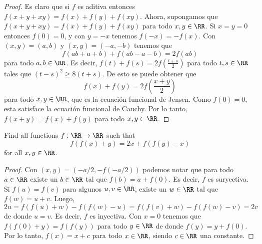 \begin{proof}
	Es claro que si $f$ es aditiva entonces $f(x+y+xy)=f(x)+f(y)+f(xy)$. Ahora, supongamos que $f(x+y+xy)=f(x)+f(y)+f(xy)$ para todo $x,y\in\RR$. Si $x=y=0$ entonces $f(0)=0$, y con $y=-x$ tenemos $f(-x)=-f(x)$. Con $(x,y)=(a,b)$ y $(x,y)=(-a,-b)$ tenemos que
	\[f(ab+a+b)+f(ab-a-b)=2f(ab)\]
	para todo $a,b\in\RR$. Es decir, $f(t)+f(s)=2f\left(\frac{t+s}{2}\right)$ para todo $t,s\in\RR$ tales que $(t-s)^2\ge 8(t+s)$. De esto se puede obtener que
	\[f(x)+f(y)=2f\left(\frac{x+y}{2}\right)\]
	para todo $x,y\in\RR$, que es la ecuación funcional de Jensen. Como $f(0)=0$, esta satisface la ecuación funcional de Cauchy. Por lo tanto, $f(x+y)=f(x)+f(y)$ para todo $x,y\in\RR$.
\end{proof}

\begin{probEG}[ISL 2002/A1]
	Find all functions $f:\RR\to\RR$ such that
	\[f(f(x)+y)=2x+f(f(y)-x)\]
	for all $x,y\in\RR$.
\end{probEG}

\begin{proof}
	Con $(x,y)=(-a/2,-f(-a/2))$ podemos notar que para todo $a\in\RR$ existe un $b\in\RR$ tal que $f(b)=a+f(0)$. Es decir, $f$ es suryectiva. Si $f(u)=f(v)$ para algunos $u,v\in\RR$, existe un $w\in\RR$ tal que $f(w)=u+v$. Luego,
	\[2u=f(f(u)+w)-f(f(w)-u)=f(f(v)+w)-f(f(w)-v)=2v\]
	de donde $u=v$. Es decir, $f$ es inyectiva. Con $x=0$ tenemos que $f(f(0)+y)=f(f(y))$ para todo $y\in\RR$ de donde $f(y)=y+f(0)$. Por lo tanto, $f(x)=x+c$ para todo $x\in\RR$, siendo $c\in\RR$ una constante.
\end{proof}

